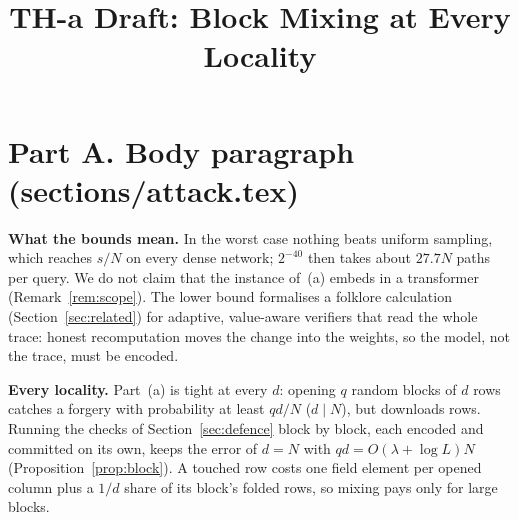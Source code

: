 \documentclass[conference,compsoc]{IEEEtran}
\newcommand{\para}[1]{\par\noindent\textbf{#1}\quad}
\theoremstyle{plain}
\theoremstyle{definition}
\theoremstyle{remark}
\begin{document}
\title{TH-a Draft: Block Mixing at Every Locality}
\author{}
\maketitle

\section*{Part A. Body paragraph (sections/attack.tex)}

\para{What the bounds mean.} In the worst case nothing beats uniform sampling, which reaches $s/N$
on every dense network; $2^{-40}$ then takes about $27.7N$ paths per query. We do not claim that the
instance of~(a) embeds in a transformer (Remark~\ref{rem:scope}). The lower bound formalises a
folklore calculation (Section~\ref{sec:related}) for adaptive, value-aware verifiers that read the
whole trace: honest recomputation moves the change into the weights, so the model, not the trace,
must be encoded.

\para{Every locality.} Part~(a) is tight at every $d$: opening $q$ random blocks of $d$ rows catches
a forgery with probability at least $qd/N$ ($d\mid N$), but downloads rows. Running the checks of
Section~\ref{sec:defence} block by block, each encoded and committed on its own, keeps the error of
$d=N$ with $qd=O(\lambda+\log L)N$ (Proposition~\ref{prop:block}). A touched row costs one field
element per opened column plus a $1/d$ share of its block's folded rows, so mixing pays only for large
blocks.

\end{document}
